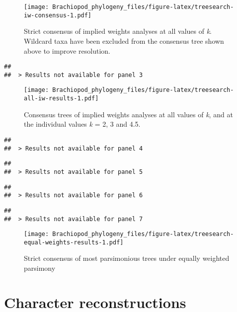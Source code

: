 \documentclass[openany]{book}
\theoremstyle{definition}
\theoremstyle{definition}
\theoremstyle{definition}
\theoremstyle{remark}
\begin{document}
\begin{figure}
\centering
\texttt{[image: Brachiopod\_phylogeny\_files/figure-latex/treesearch-iw-consensus-1.pdf]}
\caption{\label{fig:treesearch-iw-consensus}Strict consensus of implied weights analyses at all
values of \emph{k}. Wildcard taxa have been excluded from the consensus
tree shown above to improve resolution.}
\end{figure}








\clearpage 

\begin{verbatim}
## 
##  > Results not available for panel 3
\end{verbatim}

\begin{figure}
\centering
\texttt{[image: Brachiopod\_phylogeny\_files/figure-latex/treesearch-all-iw-results-1.pdf]}
\caption{\label{fig:treesearch-all-iw-results}Consensus trees of implied weights analyses
at all values of \emph{k}, and at the individual
values \emph{k} = 2, 3 and 4.5.}
\end{figure}

\clearpage 

\begin{verbatim}
## 
##  > Results not available for panel 4
\end{verbatim}

\begin{verbatim}
## 
##  > Results not available for panel 5
\end{verbatim}

\begin{verbatim}
## 
##  > Results not available for panel 6
\end{verbatim}

\begin{verbatim}
## 
##  > Results not available for panel 7
\end{verbatim}

\clearpage

\begin{figure}
\centering
\texttt{[image: Brachiopod\_phylogeny\_files/figure-latex/treesearch-equal-weights-results-1.pdf]}
\caption{\label{fig:treesearch-equal-weights-results}Strict consensus of
most parsimonious trees under equally weighted parsimony}
\end{figure}

\clearpage

\hypertarget{reconstructions}{\chapter{Character
reconstructions}\label{reconstructions}}
\end{document}
